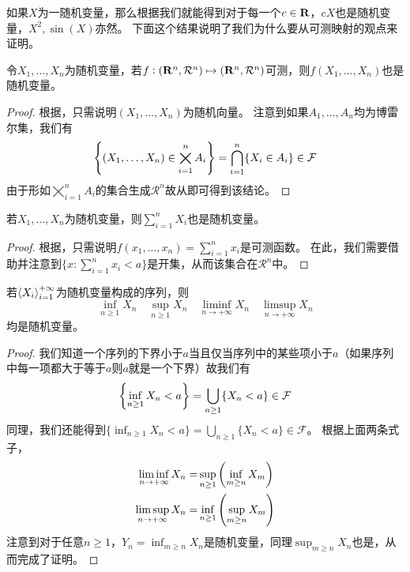 \documentclass[../main.tex]{subfiles}
\begin{document}
如果\(X\)为一随机变量，那么根据我们就能得到对于每一个\(c\in\mathbf{R}\)，\(cX\)也是随机变量，\(X^2,\sin(X)\)亦然。
下面这个结果说明了我们为什么要从可测映射的观点来证明。
\begin{theorem}\label{thm:1.3.5}
	令\(X_1,\dots,X_n\)为随机变量，若\(f:(\mathbf{R}^n,\mathcal{R}^n)\mapsto(\mathbf{R}^n,\mathcal{R}^n)\)可测，则\(f(X_1,\dots,X_n)\)也是随机变量。
\end{theorem}
\begin{proof}
	根据，只需说明\((X_1,\dots,X_n)\)为随机向量。
	注意到如果\(A_1,\dots,A_n\)均为博雷尔集，我们有
	\[\cbr{(X_1,\dots,X_n)\in\bigtimes_{i=1}^nA_i}=\bigcap_{i=1}^n\{X_i\in A_i\}\in\mathcal{F}\]
	由于形如\(\bigtimes_{i=1}^nA_i\)的集合生成\(\mathcal{R}^n\)故从即可得到该结论。
\end{proof}

\begin{theorem}\label{thm:1.3.6}
	若\(X_1,\dots,X_n\)为随机变量，则\(\sum_{i=1}^n X_i\)也是随机变量。
\end{theorem}
\begin{proof}
	根据，只需说明\(f(x_1,\dots,x_n)=\sum_{i=1}^nx_i\)是可测函数。
	在此，我们需要借助并注意到\(\{x:\sum_{i=1}^nx_i<a\}\)是开集，从而该集合在\(\mathcal{R}^n\)中。
\end{proof}

\begin{theorem}\label{thm:1.3.7}
	若\(\left<X_i\right>^{+\infty}_{i=1}\)为随机变量构成的序列，则
	\[\inf_{n\geq1}X_n\quad \sup_{n\geq1}X_n\quad \liminf\limits_{n\rightarrow+\infty} X_n\quad \limsup\limits_{n\rightarrow+\infty} X_n\]
	均是随机变量。
\end{theorem}
\begin{proof}
	我们知道一个序列的下界小于\(a\)当且仅当序列中的某些项小于\(a\)（如果序列中每一项都大于等于\(a\)则\(a\)就是一个下界）故我们有
	\[\cbr{\inf_{n\geq1}X_n<a}=\bigcup_{n\geq1}\{X_n<a\}\in\mathcal{F}\]
	同理，我们还能得到\(\{\inf_{n\geq1}X_n<a\}=\bigcup_{n\geq1}\{X_n<a\}\in\mathcal{F}\)。
	根据上面两条式子，
	\begin{align*}
		\liminf\limits_{n\rightarrow+\infty}X_n=&\sup_{n\geq1}\del{\inf_{m\geq n}X_m}\\ \limsup\limits_{n\rightarrow+\infty}X_n=&\inf_{n\geq1}\del{\sup_{m\geq n}X_m}
	\end{align*}
	注意到对于任意\(n\geq 1\)，\(Y_n=\inf_{m\geq n}X_n\)是随机变量，同理\(\sup_{m\geq n}X_n\)也是，从而完成了证明。
\end{proof}
\end{document}
